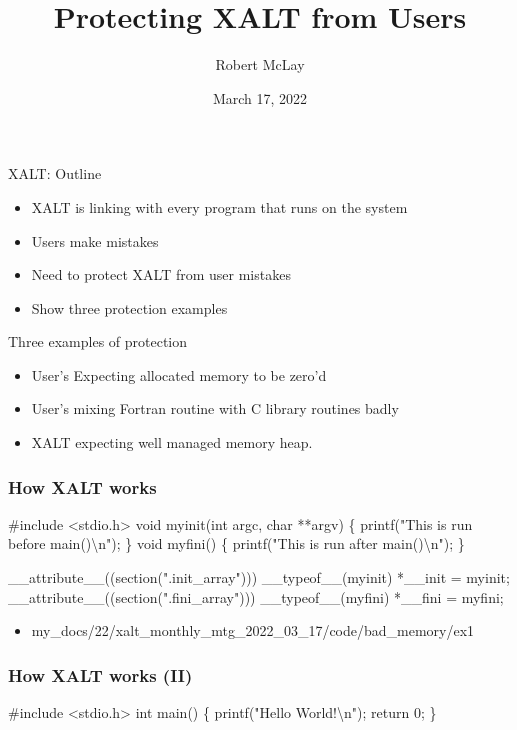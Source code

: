 \documentclass{beamer}
\begin{document}
\title[XALT]{Protecting XALT from Users}
\author{Robert McLay}
\date{March 17, 2022}

\frame{\titlepage}

\begin{frame}{XALT: Outline}
  \begin{itemize}
    \item XALT is linking with every program that runs on the system
    \item Users make mistakes
    \item Need to protect XALT from user mistakes
    \item Show three protection examples 
  \end{itemize}
\end{frame}

\begin{frame}{Three examples of protection}
  \begin{itemize}
    \item User's Expecting allocated memory to be zero'd
    \item User's mixing Fortran routine with C library routines badly
    \item XALT expecting well managed memory heap.
  \end{itemize}
\end{frame}


\begin{frame}[fragile]
    \frametitle{How XALT works}
 {\tiny
    \begin{semiverbatim}
#include <stdio.h>
void myinit(int argc, char **argv)
\{ printf("This is run before main()\textbackslash{}n"); \}
void myfini()
\{ printf("This is run after main()\textbackslash{}n"); \}

__attribute__((section(".init_array"))) __typeof__(myinit) *__init = myinit;
__attribute__((section(".fini_array"))) __typeof__(myfini) *__fini = myfini;
    \end{semiverbatim}
}
  \begin{itemize}
    \item my\_docs/22/xalt\_monthly\_mtg\_2022\_03\_17/code/bad\_memory/ex1
  \end{itemize}
\end{frame}

\begin{frame}[fragile]
    \frametitle{How XALT works (II)}
 {\small
    \begin{semiverbatim}
#include <stdio.h>
int main()
\{
  printf("Hello World!\textbackslash{}n");
  return 0;
\}

    \end{semiverbatim}
}
\end{frame}
\end{document}
